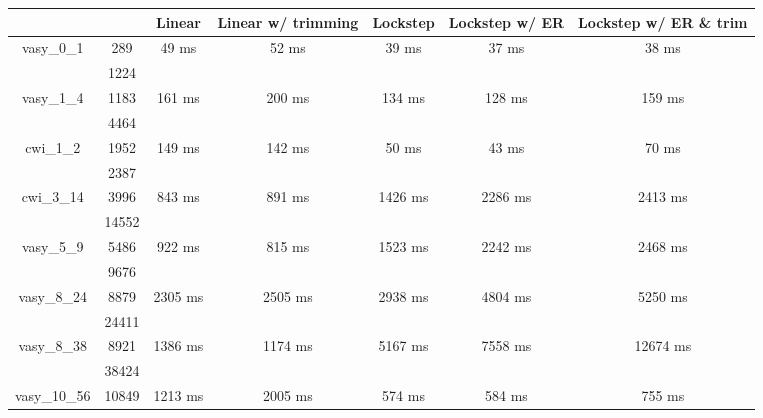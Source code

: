 \documentclass[../master/master.tex]{subfiles}
\begin{document}
\begin{center}
\begin{tabular}{ |c|c||c||c||c||c||c|| } 
\hline
 \multicolumn{2}{|c||}{} & Linear & Linear w/ trimming & Lockstep & Lockstep w/ ER & Lockstep w/ ER \& trim \\
\hline
\multirow{2}{3.8em}{vasy\_0\_1} & 289 & \multirow{2}{3.8em}{49 ms} & \multirow{2}{3.8em}{52 ms} & \multirow{2}{3.8em}{39 ms} & \multirow{2}{3.8em}{37 ms} & \multirow{2}{3.8em}{38 ms} \\
\cline{2-2}
 & 1224  & & & & & \\
\hline
\multirow{2}{3.8em}{vasy\_1\_4} & 1183 & \multirow{2}{3.8em}{161 ms} & \multirow{2}{3.8em}{200 ms} & \multirow{2}{3.8em}{134 ms} & \multirow{2}{3.8em}{128 ms} & \multirow{2}{3.8em}{159 ms} \\
\cline{2-2}
 & 4464  & & & & & \\
\hline
\multirow{2}{3.8em}{cwi\_1\_2} & 1952 & \multirow{2}{3.8em}{149 ms} & \multirow{2}{3.8em}{142 ms} & \multirow{2}{3.8em}{50 ms} & \multirow{2}{3.8em}{43 ms} & \multirow{2}{3.8em}{70 ms} \\
\cline{2-2}
 & 2387  & & & & & \\
\hline
\multirow{2}{3.8em}{cwi\_3\_14} & 3996 & \multirow{2}{3.8em}{843 ms} & \multirow{2}{3.8em}{891 ms} & \multirow{2}{3.8em}{1426 ms} & \multirow{2}{3.8em}{2286 ms} & \multirow{2}{3.8em}{2413 ms} \\
\cline{2-2}
 & 14552  & & & & & \\
\hline
\multirow{2}{3.8em}{vasy\_5\_9} & 5486 & \multirow{2}{3.8em}{922 ms} & \multirow{2}{3.8em}{815 ms} & \multirow{2}{3.8em}{1523 ms} & \multirow{2}{3.8em}{2242 ms} & \multirow{2}{3.8em}{2468 ms} \\
\cline{2-2}
 & 9676  & & & & & \\
\hline
\multirow{2}{3.8em}{vasy\_8\_24} & 8879 & \multirow{2}{3.8em}{2305 ms} & \multirow{2}{3.8em}{2505 ms} & \multirow{2}{3.8em}{2938 ms} & \multirow{2}{3.8em}{4804 ms} & \multirow{2}{3.8em}{5250 ms} \\
\cline{2-2}
 & 24411  & & & & & \\
\hline
\multirow{2}{3.8em}{vasy\_8\_38} & 8921 & \multirow{2}{3.8em}{1386 ms} & \multirow{2}{3.8em}{1174 ms} & \multirow{2}{3.8em}{5167 ms} & \multirow{2}{3.8em}{7558 ms} & \multirow{2}{3.8em}{12674 ms} \\
\cline{2-2}
 & 38424  & & & & & \\
\hline
\multirow{2}{3.8em}{vasy\_10\_56} & 10849 & \multirow{2}{3.8em}{1213 ms} & \multirow{2}{3.8em}{2005 ms} & \multirow{2}{3.8em}{574 ms} & \multirow{2}{3.8em}{584 ms} & \multirow{2}{3.8em}{755 ms} \\

\end{tabular}
\end{center}
\end{document}
